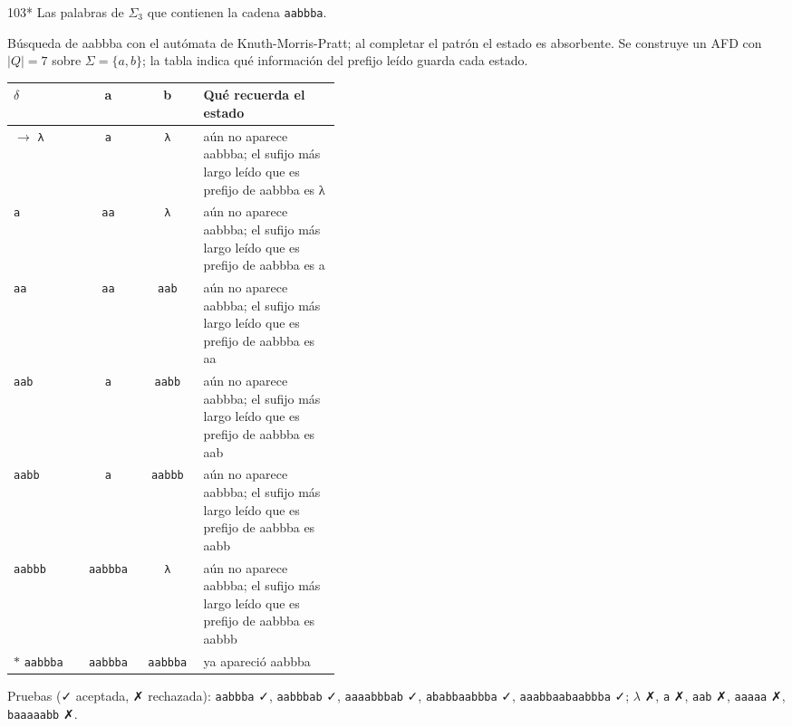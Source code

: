 \documentclass[11pt]{article}
\begin{document}
\begin{ejercicio}{103}{*}
Las palabras de $\Sigma_3$ que contienen la cadena \texttt{aabbba}.
\end{ejercicio}
\proc Búsqueda de aabbba con el autómata de Knuth-Morris-Pratt; al completar el patrón el estado es absorbente. Se construye un AFD con $|Q| = 7$ sobre $\Sigma = \{a, b\}$; la tabla indica qué información del prefijo leído guarda cada estado.
\begin{center}\small\begin{tabular}{lccp{0.42\linewidth}}\toprule
$\delta$ & a & b & Qué recuerda el estado \\\midrule
$\to$ \texttt{λ} & \texttt{a} & \texttt{λ} & aún no aparece aabbba; el sufijo más largo leído que es prefijo de aabbba es λ \\
 \texttt{a} & \texttt{aa} & \texttt{λ} & aún no aparece aabbba; el sufijo más largo leído que es prefijo de aabbba es a \\
 \texttt{aa} & \texttt{aa} & \texttt{aab} & aún no aparece aabbba; el sufijo más largo leído que es prefijo de aabbba es aa \\
 \texttt{aab} & \texttt{a} & \texttt{aabb} & aún no aparece aabbba; el sufijo más largo leído que es prefijo de aabbba es aab \\
 \texttt{aabb} & \texttt{a} & \texttt{aabbb} & aún no aparece aabbba; el sufijo más largo leído que es prefijo de aabbba es aabb \\
 \texttt{aabbb} & \texttt{aabbba} & \texttt{λ} & aún no aparece aabbba; el sufijo más largo leído que es prefijo de aabbba es aabbb \\
$*$ \texttt{aabbba} & \texttt{aabbba} & \texttt{aabbba} & ya apareció aabbba \\
\bottomrule\end{tabular}\end{center}
Pruebas (✓ aceptada, ✗ rechazada): \texttt{aabbba} ✓, \texttt{aabbbab} ✓, \texttt{aaaabbbab} ✓, \texttt{ababbaabbba} ✓, \texttt{aaabbaabaabbba} ✓; $\lambda$ ✗, \texttt{a} ✗, \texttt{aab} ✗, \texttt{aaaaa} ✗, \texttt{baaaaabb} ✗.
\end{document}
